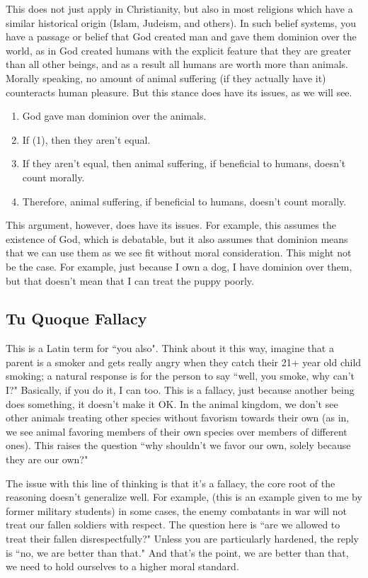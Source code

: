 This does not just apply in Christianity, but also in most religions which have a similar historical origin (Islam, Judeism, and others). In such belief systems, you have a passage or belief that God created man and gave them dominion over the world, as in God created humans with the explicit feature that they are greater than all other beings, and as a result all humans are worth more than animals. Morally speaking, no amount of animal suffering (if they actually have it) counteracts human pleasure.  But this stance does have its issues, as we will see.
\begin{enumerate}
    \item God gave man dominion over the animals.
    \item If (1), then they aren't equal.
    \item If they aren't equal, then animal suffering, if beneficial to humans, doesn't count morally.
    \item Therefore, animal suffering, if beneficial to humans, doesn't count morally. 
\end{enumerate}
This argument, however, does have its issues. For example, this assumes the existence of God, which is debatable, but it also assumes that dominion means that we can use them as we see fit without moral consideration. This might not be the case. For example, just because I own a dog, I have dominion over them, but that doesn't mean that I can treat the puppy poorly.  

\subsection{Tu Quoque Fallacy}

This is a Latin term for ``you also". Think about it this way, imagine that a parent is a smoker and gets really angry when they catch their 21+ year old child smoking; a natural response is for the person to say ``well, you smoke, why can't I?" Basically, if you do it, I can too. This is a fallacy, just because another being does something, it doesn't make it OK. In the animal kingdom, we don't see other animals treating other species without favorism towards their own (as in, we see animal favoring members of their own species over members of different ones). This raises the question ``why shouldn't we favor our own, solely because they are our own?" 

The issue with this line of thinking is that it's a fallacy, the core root of the reasoning doesn't generalize well. For example, (this is an example given to me by former military students) in some cases, the enemy combatants in war will not treat our fallen soldiers with respect. The question here is ``are we allowed to treat their fallen disrespectfully?" Unless you are particularly hardened, the reply is ``no, we are better than that." And that's the point, we are better than that, we need to hold ourselves to a higher moral standard.


